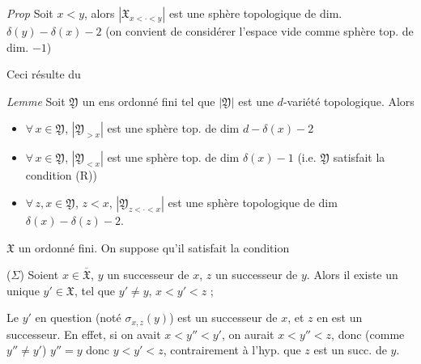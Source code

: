 \documentclass[11pt,a4paper]{article}
\begin{document}
\emph{Prop}  Soit $x < y$, alors
$|\mathfrak{X}_{x<\cdot<y}|$ est une sphère topologique de dim.
$\delta(y) - \delta(x) - 2$ (on convient de considérer l'espace vide comme
sphère top. de dim. $-1$)

Ceci résulte du

\emph{Lemme} Soit $\mathfrak{Y}$ un ens ordonné fini tel que $|\mathfrak{Y}|$
est une $d$-variété topologique. Alors
\begin{itemize}
  \item[a)] $\forall\, x \in \mathfrak{Y}$, $|\mathfrak{Y}_{>x}|$ est une sphère
    top. de dim $d - \delta(x) - 2$
  \item[b)] $\forall\, x \in \mathfrak{Y}$, $|\mathfrak{Y}_{<x}|$ est une sphère
    top. de dim $\delta(x) - 1$ (i.e. $\mathfrak{Y}$ satisfait la condition
    (R))
  \item[c)] $\forall\, z, x \in \mathfrak{Y}$, $z < x$, $|\mathfrak{Y}_{z<\cdot<x}|$
     est une sphère topologique de dim
    $\delta(x) - \delta(z) - 2$.
\end{itemize}


$\mathfrak{X}$ un ordonné fini. On suppose qu'il satisfait la condition

($\Sigma$) Soient $x \in \overline{\mathfrak{X}}$, $y$ un successeur de $x$,
$z$ un successeur de $y$. Alors il existe un unique $y' \in \mathfrak{X}$, tel
que $y' \neq y$, $x < y' < z$ ;

Le $y'$ en question (noté $\sigma_{x,z}(y)$) est un successeur de $x$, et $z$
en est un successeur. En effet, si on avait  $x < y'' < y'$, on
aurait $x < y'' < z$, donc (comme $y'' \neq y'$) $y'' = y$ donc
$y < y' < z$, contrairement à l'hyp. que $z$ est un succ. de $y$.

\end{document}
